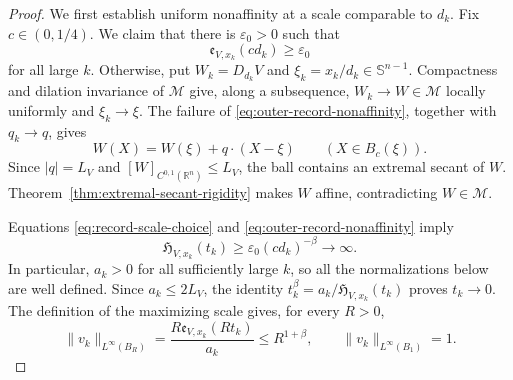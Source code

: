 \documentclass[11pt,reqno]{amsart}
\numberwithin{equation}{section}
\newcommand{\R}{\mathbb R}
\theoremstyle{remark}
\begin{document}
\begin{proof}
We first establish uniform nonaffinity at a scale comparable to $d_k$.
Fix $c\in(0,1/4)$.  We claim that there is
$\varepsilon_0>0$ such that
\begin{equation}
 \mathfrak e_{V,x_k}(cd_k)\ge\varepsilon_0
 \label{eq:outer-record-nonaffinity}
\end{equation}
for all large $k$.  Otherwise, put $W_k=D_{d_k}V$ and
$\xi_k=x_k/d_k\in\mathbb S^{n-1}$.  Compactness and dilation invariance of
$\mathscr M$ give, along a subsequence,
$W_k\to W\in\mathscr M$ locally uniformly and $\xi_k\to\xi$.  The failure
of \eqref{eq:outer-record-nonaffinity}, together with $q_k\to q$, gives
\[
 W(X)=W(\xi)+q\cdot(X-\xi)
 \qquad (X\in B_c(\xi)).
\]
Since $|q|=L_V$ and $[W]_{C^{0,1}(\R^n)}\le L_V$, the ball contains an
extremal secant of $W$.  Theorem~\ref{thm:extremal-secant-rigidity} makes
$W$ affine, contradicting $W\in\mathscr M$.

Equations \eqref{eq:record-scale-choice} and
\eqref{eq:outer-record-nonaffinity} imply
\[
 \mathfrak H_{V,x_k}(t_k)
 \ge\varepsilon_0(cd_k)^{-\beta}\longrightarrow\infty.
\]
In particular, \(a_k>0\) for all sufficiently large \(k\), so all the
normalizations below are well defined.
Since $a_k\le2L_V$, the identity
$t_k^\beta=a_k/\mathfrak H_{V,x_k}(t_k)$ proves $t_k\to0$.
The definition of the maximizing scale gives, for every $R>0$,
\begin{equation}
 \|v_k\|_{L^\infty(B_R)}
 =\frac{R\mathfrak e_{V,x_k}(Rt_k)}{a_k}
 \le R^{1+\beta},
 \qquad
 \|v_k\|_{L^\infty(B_1)}=1.
 \label{eq:record-growth-before-limit}
\end{equation}


\end{proof}
\end{document}
